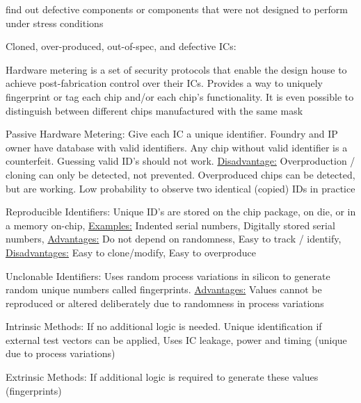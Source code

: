 \documentclass[landscape, a4paper]{article}
\begin{document}
\begin{minipage}[t]{0.2\linewidth}
\begin{betterlist}
\begin{betterlist}
\begin{betterlist}
\begin{betterlist}
\begin{betterlist}
						\item find out defective components or components that were not designed to perform under stress conditions
					\end{betterlist}
				\end{betterlist}
			\end{betterlist}
		\end{betterlist}
		\item \alert{Cloned, over-produced, out-of-spec, and defective ICs:}
		\begin{betterlist}
			\item \alert{Hardware metering} is a set of security protocols that enable the design house to achieve post-fabrication control over their ICs.  Provides a way to uniquely fingerprint or tag each chip and/or each chip’s functionality. It is even possible to distinguish between different chips manufactured with the same mask
			\item \alert{Passive Hardware Metering:} Give each IC a unique identifier. Foundry and IP owner have database with valid identifiers. Any chip without valid identifier is a counterfeit. Guessing valid ID's should not work. \underline{Disadvantage:} Overproduction / cloning can only be detected, not prevented. Overproduced chips can be detected, but are working. Low probability to observe two identical (copied) IDs in practice
			\begin{betterlist}
				\item \alert{Reproducible Identifiers:} Unique ID’s are stored on the chip package, on die, or in a memory on-chip, \underline{Examples:} Indented serial numbers, Digitally stored serial numbers, \underline{Advantages:} Do not depend on randomness, Easy to track / identify, \underline{Disadvantages:} Easy to clone/modify, Easy to overproduce
				\item \alert{Unclonable Identifiers:} Uses random process variations in silicon to generate random unique numbers called \alert{fingerprints}. \underline{Advantages:} Values cannot be reproduced or altered deliberately due to randomness in process variations
				\begin{betterlist}
					\item \alert{Intrinsic Methods:} If no additional logic is needed. Unique identification if external test vectors can be applied, Uses IC leakage, power and timing (unique due to process variations)%
					\item \alert{Extrinsic Methods:} If additional logic is required to generate these values (fingerprints)

\end{betterlist}
\end{betterlist}
\end{betterlist}
\end{betterlist}
\end{minipage}
\end{document}
